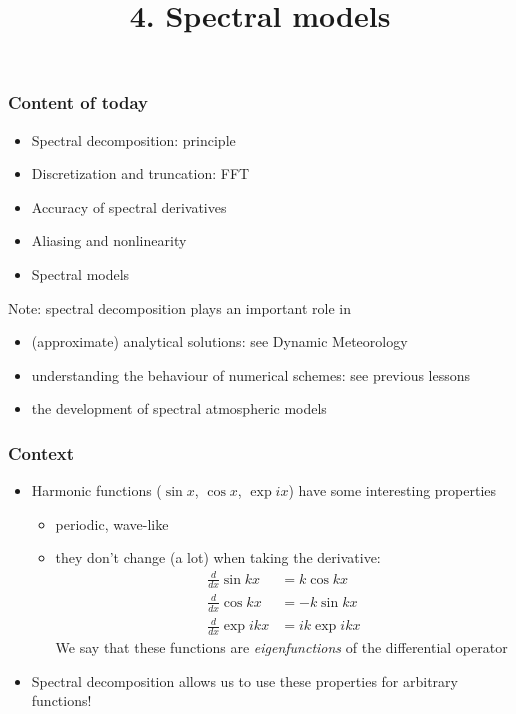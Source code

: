 \documentclass[aspectratio=149,9pt]{beamer}
\title{4. Spectral models}%
\begin{document}
%
%
\begin{frame}[plain]
	\titlepage
\end{frame}
%
%
\begin{frame}
	\frametitle{Content of today}
	\vfill\begin{itemize}
		\item Spectral decomposition: principle\vfill
		\item Discretization and truncation: FFT\vfill
		\item Accuracy of spectral derivatives\vfill
		\item Aliasing and nonlinearity\vfill
		\item Spectral models
	\end{itemize}\vfill
\pause
	\vfill\par
	Note: spectral decomposition plays an important role in 
	\begin{itemize}
		\item (approximate) analytical solutions: see Dynamic Meteorology
		\item understanding the behaviour of numerical schemes: see previous lessons
		\item the development of spectral atmospheric models
	\end{itemize}\vfill
\end{frame}
%
%
\begin{frame}
	\frametitle{Context}
	\vfill\begin{itemize}
		\item Harmonic functions ($\sin x$, $\cos x$, $\exp i x$) have some interesting properties\vfill
			\begin{itemize}
				\item periodic, wave-like\vfill
				\item they don't change (a lot) when taking the derivative:
					\begin{align*}
						\frac{d}{dx}\sin k x&=k\cos k x\\
						\frac{d}{dx}\cos k x&=-k\sin k x\\
						\frac{d}{dx}\exp i k x&= i k \exp i k x
					\end{align*}
					We say that these functions are \emph{eigenfunctions} of the differential operator\vfill
			\end{itemize}
		\item Spectral decomposition allows us to use these properties for arbitrary functions!
	\end{itemize}\vfill
\end{frame}
\end{document}
